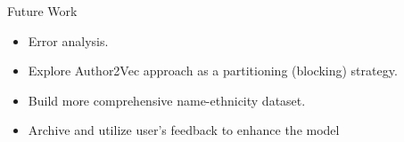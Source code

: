 \documentclass{beamer}
\begin{document}

\begin{frame}{Future Work}

\begin{itemize}
\item Error analysis.\\[2em]

\item Explore Author2Vec approach as a partitioning (blocking) strategy.\\[2em]

\item Build more comprehensive name-ethnicity dataset. \\[2em]

\item Archive and utilize user's feedback to enhance the model \\[2em]

\end{itemize}

\end{frame}
\end{document}
